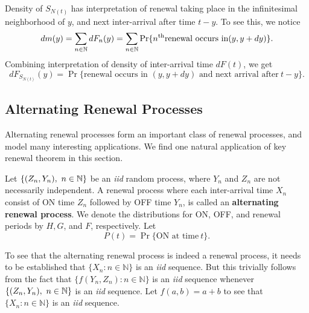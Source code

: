 \documentclass[a4paper,10pt,english]{article}
\begin{document}
\begin{rem} Density of $S_{N(t)}$ has interpretation of renewal taking place in the infinitesimal neighborhood of $y$, and next inter-arrival after time $t-y$. To see this, we notice 
\begin{equation*}
dm(y)=\sum_{n \in \mathbb{N}}dF_n(y) =\sum_{n \in \mathbb{N}}\Pr\{n^{\text{th}} \text{renewal occurs in} (y,y+dy)\}.
\end{equation*}
Combining interpretation of density of inter-arrival time $dF(t)$, we get
\begin{equation*}
dF_{S_{N(t)}}(y)=\Pr\{\text{renewal occurs in }(y,y+dy) \text{ and next arrival after}~ t-y\}.
\end{equation*}
\end{rem}
\subsection{Alternating Renewal Processes}
Alternating renewal processes form an important class of renewal processes, and model many interesting applications. We find one natural application of  key renewal theorem  in this section. 
\begin{defn} Let $\{(Z_n,Y_n),~n \in \mathbb{N}\}$ be an \emph{iid} random process, where $Y_n$ and $Z_n$ are not necessarily independent. A renewal process where each inter-arrival time $X_n$ consist of ON time $Z_n$ followed by OFF time $Y_n$, is called an \textbf{alternating renewal process}. We denote the distributions for ON, OFF, and renewal periods by $H, G$, and $F$, respectively. Let 
\begin{equation*}
P(t)=\Pr\{\text{ON at time}~ t\}.
\end{equation*}
\end{defn}

\begin{rem}
To see that the alternating renewal process is indeed a renewal process, it needs to be established that $\{X_n:n\in\mathbb{N}\}$ is an \emph{iid} sequence. But this trivially follows from the fact that $\{f(Y_n,Z_n):n\in\mathbb{N}\}$ is an \emph{iid} sequence whenever $\{(Z_n,Y_n),~n \in \mathbb{N}\}$ is an \emph{iid} sequence. Let $f(a,b) = a+b$ to see that $\{X_n:n\in\mathbb{N}\}$ is an \emph{iid} sequence.
\end{rem}
\end{document}
